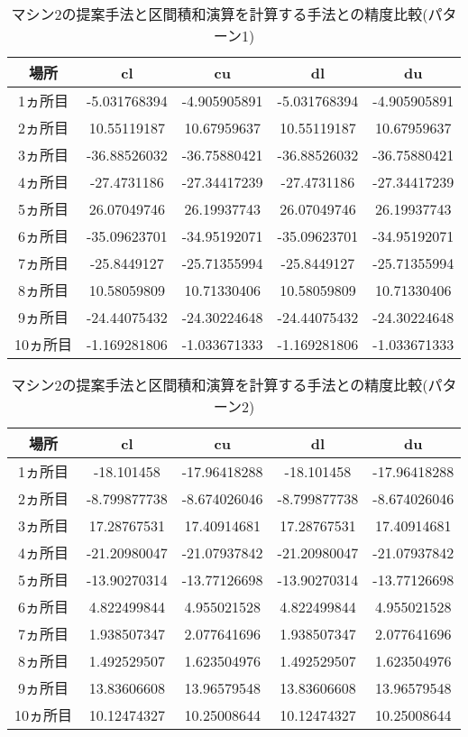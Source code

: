 \documentclass[11pt,a4paper]{jsreport}
\theoremstyle{definition}
\begin{document}
\begin{table}[H]
\centering
\begin{tabular}{|c|c|c|c|c|}
\hline
場所 & cl & cu & dl & du \\ \hline
1ヵ所目 & -5.031768394 & -4.905905891 & -5.031768394 & -4.905905891 \\ \hline
2ヵ所目 & 10.55119187 & 10.67959637 & 10.55119187 & 10.67959637 \\ \hline
3ヵ所目 & -36.88526032 & -36.75880421 & -36.88526032 & -36.75880421 \\ \hline
4ヵ所目 & -27.4731186 & -27.34417239 & -27.4731186 & -27.34417239 \\ \hline
5ヵ所目 & 26.07049746 & 26.19937743 & 26.07049746 & 26.19937743 \\ \hline
6ヵ所目 & -35.09623701 & -34.95192071 & -35.09623701 & -34.95192071 \\ \hline
7ヵ所目 & -25.8449127 & -25.71355994 & -25.8449127 & -25.71355994 \\ \hline
8ヵ所目 & 10.58059809 & 10.71330406 & 10.58059809 & 10.71330406 \\ \hline
9ヵ所目 & -24.44075432 & -24.30224648 & -24.44075432 & -24.30224648 \\ \hline
10ヵ所目 & -1.169281806 & -1.033671333 & -1.169281806 & -1.033671333 \\ \hline
\end{tabular}
\caption{マシン2の提案手法と区間積和演算を計算する手法との精度比較(パターン1)}
\end{table}

\begin{table}[H]
\centering
\begin{tabular}{|c|c|c|c|c|}
\hline
場所 & cl & cu & dl & du \\ \hline
1ヵ所目 & -18.101458 & -17.96418288 & -18.101458 & -17.96418288 \\ \hline
2ヵ所目 & -8.799877738 & -8.674026046 & -8.799877738 & -8.674026046 \\ \hline
3ヵ所目 & 17.28767531 & 17.40914681 & 17.28767531 & 17.40914681 \\ \hline
4ヵ所目 & -21.20980047 & -21.07937842 & -21.20980047 & -21.07937842 \\ \hline
5ヵ所目 & -13.90270314 & -13.77126698 & -13.90270314 & -13.77126698 \\ \hline
6ヵ所目 & 4.822499844 & 4.955021528 & 4.822499844 & 4.955021528 \\ \hline
7ヵ所目 & 1.938507347 & 2.077641696 & 1.938507347 & 2.077641696 \\ \hline
8ヵ所目 & 1.492529507 & 1.623504976 & 1.492529507 & 1.623504976 \\ \hline
9ヵ所目 & 13.83606608 & 13.96579548 & 13.83606608 & 13.96579548 \\ \hline
10ヵ所目 & 10.12474327 & 10.25008644 & 10.12474327 & 10.25008644 \\ \hline
\end{tabular}
\caption{マシン2の提案手法と区間積和演算を計算する手法との精度比較(パターン2)}
\end{table}
\end{document}

